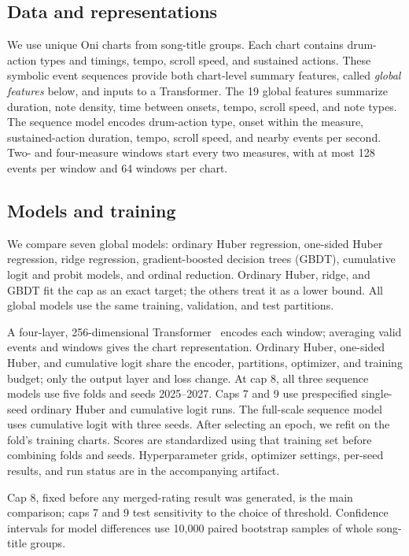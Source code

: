 \documentclass{article}
\begin{document}
\subsection{Data and representations}
We use \ChartCount{} unique Oni charts from \TitleCount{} song-title groups.
Each chart contains drum-action types and timings, tempo, scroll speed, and
sustained actions. These symbolic event sequences provide both chart-level
summary features, called \emph{global features} below, and inputs to a
Transformer. The 19 global features summarize duration, note density, time
between onsets, tempo, scroll speed, and note types. The sequence model
encodes drum-action type, onset within the measure, sustained-action duration,
tempo, scroll speed, and nearby events per second. Two- and four-measure
windows start every two measures, with at most 128 events per window and 64
windows per chart.

\subsection{Models and training}
We compare seven global models: ordinary Huber regression, one-sided Huber
regression, ridge regression, gradient-boosted decision trees (GBDT),
cumulative logit and probit models, and ordinal reduction. Ordinary Huber,
ridge, and GBDT fit the cap as an exact target; the others treat it as a
lower bound. All global models use the same training, validation, and test
partitions.

A four-layer, 256-dimensional
Transformer~\cite{vaswani2017attention} encodes each window; averaging valid
events and windows gives the chart representation. Ordinary Huber, one-sided
Huber, and cumulative logit share the encoder, partitions, optimizer, and
training budget; only the output layer and loss change. At cap 8, all three
sequence models use five folds and seeds 2025--2027. Caps 7 and 9 use
prespecified single-seed ordinary Huber and cumulative logit runs. The
full-scale sequence model uses cumulative logit with three seeds. After
selecting an epoch, we refit on the fold's training charts. Scores are
standardized using that training set before combining folds and seeds.
Hyperparameter grids, optimizer settings, per-seed results, and run
status are in the accompanying artifact.

Cap 8, fixed before any merged-rating result was generated, is the main
comparison; caps 7 and 9 test sensitivity to the choice of threshold.
Confidence intervals for model differences use 10,000 paired bootstrap
samples of whole song-title groups.
\end{document}
